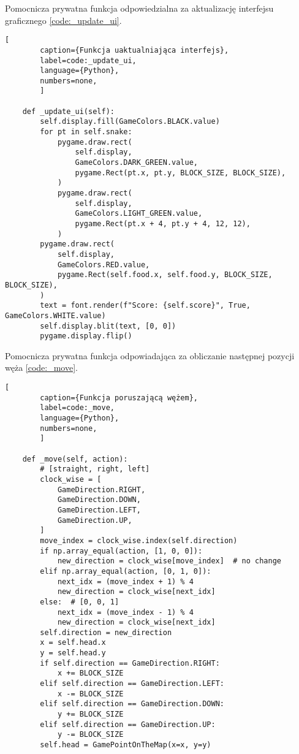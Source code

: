 Pomocnicza prywatna funkcja odpowiedzialna za aktualizację interfejsu graficznego \ref{code:_update_ui}.

\begin{onepage}
    \begin{lstlisting}[
        caption={Funkcja uaktualniająca interfejs},
        label=code:_update_ui,
        language={Python},
        numbers=none,
        ]

    def _update_ui(self):
        self.display.fill(GameColors.BLACK.value)
        for pt in self.snake:
            pygame.draw.rect(
                self.display,
                GameColors.DARK_GREEN.value,
                pygame.Rect(pt.x, pt.y, BLOCK_SIZE, BLOCK_SIZE),
            )
            pygame.draw.rect(
                self.display,
                GameColors.LIGHT_GREEN.value,
                pygame.Rect(pt.x + 4, pt.y + 4, 12, 12),
            )
        pygame.draw.rect(
            self.display,
            GameColors.RED.value,
            pygame.Rect(self.food.x, self.food.y, BLOCK_SIZE, BLOCK_SIZE),
        )
        text = font.render(f"Score: {self.score}", True, GameColors.WHITE.value)
        self.display.blit(text, [0, 0])
        pygame.display.flip()
    \end{lstlisting}
\end{onepage}

\clearpage

Pomocnicza prywatna funkcja odpowiadająca za obliczanie następnej pozycji węża \ref{code:_move}.

\begin{onepage}
    \begin{lstlisting}[
        caption={Funkcja poruszającą wężem},
        label=code:_move,
        language={Python},
        numbers=none,
        ]

    def _move(self, action):
        # [straight, right, left]
        clock_wise = [
            GameDirection.RIGHT,
            GameDirection.DOWN,
            GameDirection.LEFT,
            GameDirection.UP,
        ]
        move_index = clock_wise.index(self.direction)
        if np.array_equal(action, [1, 0, 0]):
            new_direction = clock_wise[move_index]  # no change
        elif np.array_equal(action, [0, 1, 0]):
            next_idx = (move_index + 1) % 4
            new_direction = clock_wise[next_idx]
        else:  # [0, 0, 1]
            next_idx = (move_index - 1) % 4
            new_direction = clock_wise[next_idx]
        self.direction = new_direction
        x = self.head.x
        y = self.head.y
        if self.direction == GameDirection.RIGHT:
            x += BLOCK_SIZE
        elif self.direction == GameDirection.LEFT:
            x -= BLOCK_SIZE
        elif self.direction == GameDirection.DOWN:
            y += BLOCK_SIZE
        elif self.direction == GameDirection.UP:
            y -= BLOCK_SIZE
        self.head = GamePointOnTheMap(x=x, y=y)
    \end{lstlisting}
\end{onepage}



